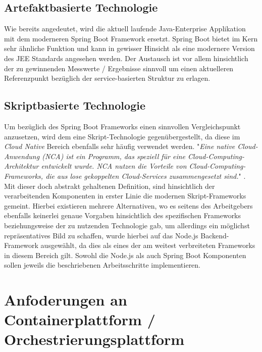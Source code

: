 \subsection{Artefaktbasierte Technologie \checkmark}
Wie bereits angedeutet, wird die aktuell laufende Java-Enterprise Applikation mit dem moderneren Spring Boot Framework ersetzt. Spring Boot bietet im Kern sehr ähnliche Funktion und kann in gewisser Hinsicht als eine modernere Version des JEE Standards angesehen werden. Der Austausch ist vor allem hinsichtlich der zu gewinnenden Messwerte / Ergebnisse sinnvoll um einen aktuelleren Referenzpunkt bezüglich der service-basierten Struktur zu erlagen.

\subsection{Skriptbasierte Technologie \checkmark}


Um bezüglich des Spring Boot Frameworks einen sinnvollen Vergleichspunkt anzusetzen, wird dem eine Skript-Technologie gegenübergestellt, da diese im \emph{Cloud Native} Bereich ebenfalls sehr häufig verwendet werden. "\emph{Eine native Cloud-Anwendung (NCA) ist ein Programm, das speziell für eine Cloud-Computing-Architektur entwickelt wurde. NCA nutzen die Vorteile von Cloud-Computing-Frameworks, die aus lose gekoppelten Cloud-Services zusammengesetzt sind.}" \cite{def-nca}. Mit dieser doch abstrakt gehaltenen Definition, sind hinsichtlich der verarbeitenden Komponenten in erster Linie die modernen Skript-Frameworks gemeint. Hierbei existieren mehrere Alternativen, wo es seitens des Arbeitgebers ebenfalls keinerlei genaue Vorgaben hinsichtlich des spezifischen Frameworks beziehungsweise der zu nutzenden Technologie gab, um allerdings ein möglichst repräsentatives Bild zu schaffen, wurde hierbei auf das Node.js Backend-Framework ausgewählt, da dies als eines der am weitest verbreiteten Frameworks in diesem Bereich gilt. Sowohl die Node.js als auch Spring Boot Komponenten sollen jeweils die beschriebenen Arbeitsschritte implementieren.


\section{Anfoderungen an Containerplattform / Orchestrierungsplattform \checkmark}
\label{sec:anforderungPlattform}

